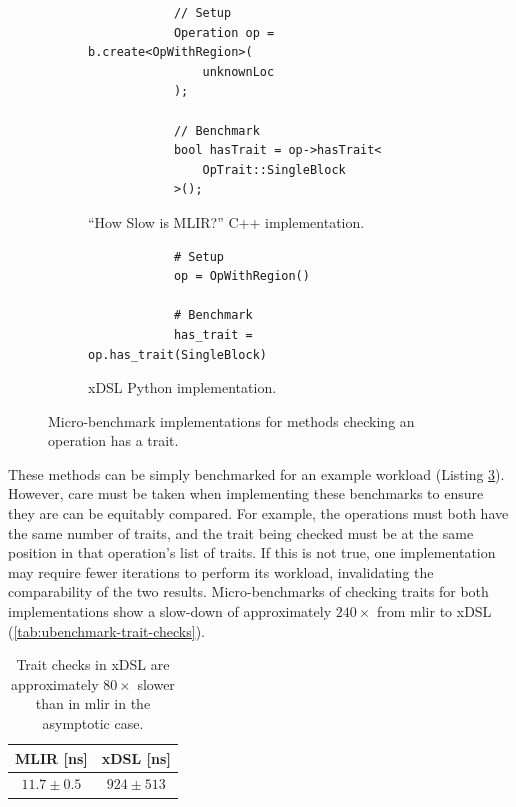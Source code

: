 \begin{figure}[H]
    \centering
    \begin{subfigure}[b]{0.45\textwidth}
       \centering
        \begin{verbatim}
            // Setup
            Operation op = b.create<OpWithRegion>(
                unknownLoc
            );

            // Benchmark
            bool hasTrait = op->hasTrait<
                OpTrait::SingleBlock
            >();
        \end{verbatim}
        \caption{``How Slow is MLIR?'' C++ implementation.}
        \label{listing:ubenchmark-trait-checks-bench-mlir}
    \end{subfigure}
    \hfill
    \begin{subfigure}[b]{0.45\textwidth}
        \centering
        \begin{verbatim}
            # Setup
            op = OpWithRegion()

            # Benchmark
            has_trait = op.has_trait(SingleBlock)
        \end{verbatim}
        \footnotesize\vspace{2em}
        \caption{xDSL Python implementation.}
        \label{listing:ubenchmark-trait-checks-bench-xdsl}
    \end{subfigure}
    \vspace{1em}
    \captionsetup{name=Listing}
    \caption{Micro-benchmark implementations for methods checking an operation has a trait.}
    \label{listing:ubenchmark-trait-checks-bench}
\end{figure}

These methods can be simply benchmarked for an example workload (Listing \ref{listing:ubenchmark-trait-checks-bench}).
However, care must be taken when implementing these benchmarks to ensure they are can be equitably compared. For example, the operations must both have the same number of traits, and the trait being checked must be at the same position in that operation's list of traits.
If this is not true, one implementation may require fewer iterations to perform its workload, invalidating the comparability of the two results.
Micro-benchmarks of checking traits for both implementations show a slow-down of approximately $240\times$ from \ac{mlir} to xDSL (\autoref{tab:ubenchmark-trait-checks}).

\begin{table}[H]
  \caption{Trait checks in xDSL are approximately $80\times$ slower than in \ac{mlir} in the asymptotic case.}
  \label{tab:ubenchmark-trait-checks}
  \centering
  \begin{tabular}{cc}
    \toprule
    \textbf{MLIR [ns]} & \textbf{xDSL [ns]}\\
    \midrule
    $11.7 \pm 0.5$ & $924 \pm 513$ \\
    \bottomrule
  \end{tabular}
\end{table}


